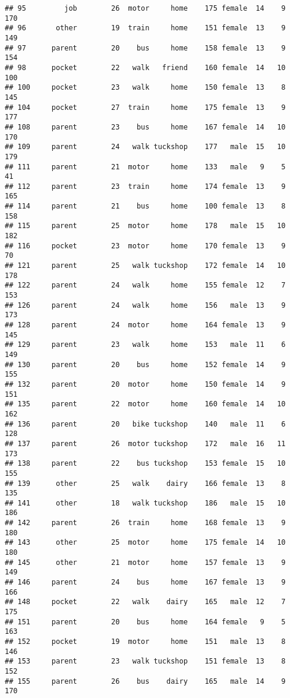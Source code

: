 \documentclass[
]{article}
\begin{document}
\begin{verbatim}
## 95         job        26  motor     home    175 female  14    9     170
## 96       other        19  train     home    151 female  13    9     149
## 97      parent        20    bus     home    158 female  13    9     154
## 98      pocket        22   walk   friend    160 female  14   10     100
## 100     pocket        23   walk     home    150 female  13    8     145
## 104     pocket        27  train     home    175 female  13    9     177
## 108     parent        23    bus     home    167 female  14   10     170
## 109     parent        24   walk tuckshop    177   male  15   10     179
## 111     parent        21  motor     home    133   male   9    5      41
## 112     parent        23  train     home    174 female  13    9     165
## 114     parent        21    bus     home    100 female  13    8     158
## 115     parent        25  motor     home    178   male  15   10     182
## 116     pocket        23  motor     home    170 female  13    9      70
## 121     parent        25   walk tuckshop    172 female  14   10     178
## 122     parent        24   walk     home    155 female  12    7     153
## 126     parent        24   walk     home    156   male  13    9     173
## 128     parent        24  motor     home    164 female  13    9     145
## 129     parent        23   walk     home    153   male  11    6     149
## 130     parent        20    bus     home    152 female  14    9     155
## 132     parent        20  motor     home    150 female  14    9     151
## 135     parent        22  motor     home    160 female  14   10     162
## 136     parent        20   bike tuckshop    140   male  11    6     128
## 137     parent        26  motor tuckshop    172   male  16   11     173
## 138     parent        22    bus tuckshop    153 female  15   10     155
## 139      other        25   walk    dairy    166 female  13    8     135
## 141      other        18   walk tuckshop    186   male  15   10     186
## 142     parent        26  train     home    168 female  13    9     180
## 143      other        25  motor     home    175 female  14   10     180
## 145      other        21  motor     home    157 female  13    9     149
## 146     parent        24    bus     home    167 female  13    9     166
## 148     pocket        22   walk    dairy    165   male  12    7     175
## 151     parent        20    bus     home    164 female   9    5     163
## 152     pocket        19  motor     home    151   male  13    8     146
## 153     parent        23   walk tuckshop    151 female  13    8     152
## 155     parent        26    bus    dairy    165   male  14    9     170

\end{verbatim}
\end{document}
